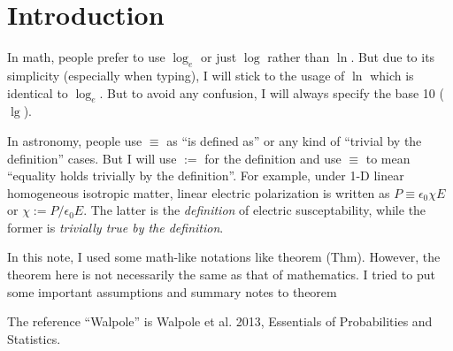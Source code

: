 \chapter{Introduction}

In math, people prefer to use $ \log_e $ or just $ \log $ rather than $ \ln $. But due to its simplicity (especially when typing), I will stick to the usage of $ \ln $ which is identical to $ \log_e $. But to avoid any confusion, I will always specify the base 10 ($ \lg $).

In astronomy, people use $ \equiv $ as ``is defined as'' or any kind of ``trivial by the definition'' cases. But I will use $ := $ for the definition and use $ \equiv $ to mean ``equality holds trivially by the definition''. For example, under 1-D linear homogeneous isotropic matter, linear electric polarization is written as $ P \equiv \epsilon_0 \chi E $ or $ \chi := P/\epsilon_0 E $. The latter is the \textit{definition} of electric susceptability, while the former is \textit{trivially true by the definition}. 

In this note, I used some math-like notations like theorem (Thm). However, the theorem here is not necessarily the same as that of mathematics. I tried to put some important assumptions and summary notes to theorem

The reference ``Walpole'' is Walpole et al. 2013, Essentials of Probabilities and Statistics.